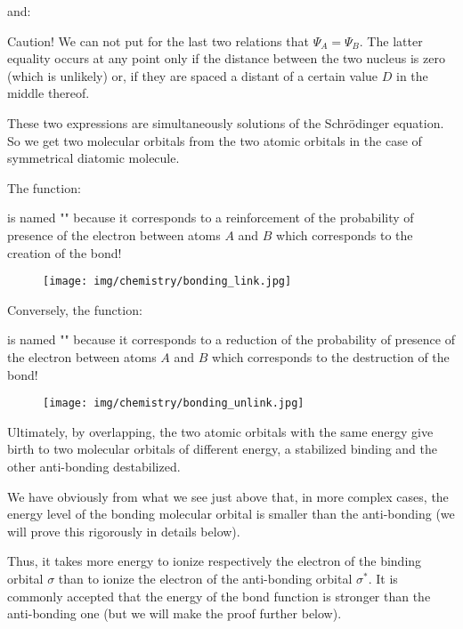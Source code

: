 	and:
	 
	
	\begin{tcolorbox}[enhanced,colback=red!5!white,colframe=black!50!red,boxrule=1pt,arc=0pt,outer arc=0pt,drop lifted shadow,after skip=10pt plus 2pt]
	\bcbombe Caution! We can not put for the last two relations that $\Psi_A=\Psi_B$. The latter equality occurs at any point only if the distance between the two nucleus is zero (which is unlikely) or, if they are spaced a distant of a certain value $D$ in the middle thereof.
	\end{tcolorbox}
	
	These two expressions are simultaneously solutions of the Schrödinger equation. So we get two molecular orbitals from the two atomic orbitals in the case of symmetrical diatomic molecule.
	
	The function:
	
	is named "" because it corresponds to a reinforcement of the probability of presence of the electron between atoms $A$ and $B$ which corresponds to the creation of the bond!
	\begin{figure}[H]
		\begin{center}
		\texttt{[image: img/chemistry/bonding\_link.jpg]}
		\end{center}	
	\end{figure}
		
	Conversely, the function:
	
	is named "" because it corresponds to a reduction of the probability of presence of the electron between atoms $A$ and $B$ which corresponds to the destruction of the bond!
	\begin{figure}[H]
		\begin{center}
		\texttt{[image: img/chemistry/bonding\_unlink.jpg]}
		\end{center}	
	\end{figure}
	
	Ultimately, by overlapping, the two atomic orbitals with the same energy give birth to two molecular orbitals of different energy, a stabilized binding and the other anti-bonding destabilized.

	We have obviously from what we see just above that, in more complex cases, the energy level of the bonding molecular orbital is smaller than the anti-bonding (we will prove this rigorously in details below).

	Thus, it takes more energy to ionize respectively the electron of the binding orbital $\sigma$ than to ionize the electron of the anti-bonding orbital $\sigma^{*}$. It is commonly accepted that the energy of the bond function is stronger than the anti-bonding one (but we will make the proof further below).

